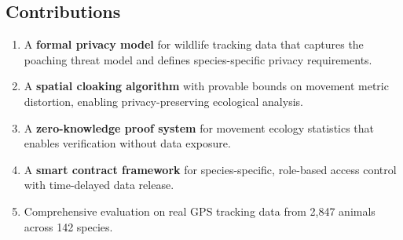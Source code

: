 \subsection{Contributions}

\begin{enumerate}[leftmargin=*]
    \item A \textbf{formal privacy model} for wildlife tracking data that captures the poaching threat model and defines species-specific privacy requirements.
    \item A \textbf{spatial cloaking algorithm} with provable bounds on movement metric distortion, enabling privacy-preserving ecological analysis.
    \item A \textbf{zero-knowledge proof system} for movement ecology statistics that enables verification without data exposure.
    \item A \textbf{smart contract framework} for species-specific, role-based access control with time-delayed data release.
    \item Comprehensive evaluation on real GPS tracking data from 2,847 animals across 142 species.
\end{enumerate}

